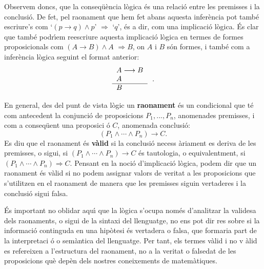 \bigskip

Observem doncs, que la conseq\"{u}\`{e}ncia l\`{o}gica \'{e}s una relaci\'{o}
entre les premisses i la conclusi\'{o}. De fet, pel raonament que hem fet
abans aquesta infer\`{e}ncia pot tamb\'{e} escriure's com `$\left(
p\rightarrow q\right) \wedge p$' $\Longrightarrow$ `$q$', \'{e}s a dir, com
una implicaci\'{o} l\`{o}gica. \'{E}s clar que tamb\'{e} podr\'{\i}em
reescriure aquesta implicaci\'{o} l\`{o}gica en termes de formes
proposicionals com $(A\longrightarrow B)\wedge A$ $\Longrightarrow B$, on $A$
i $B$ s\'{o}n formes, i tamb\'{e} com a infer\`{e}ncia l\`{o}gica seguint el
format anterior:%
\begin{equation*}
\begin{tabular}{l}
$A\longrightarrow B$ \\
$A$ \\ \hline
$B$%
\end{tabular}
\text{.}
\end{equation*}

En general, des del punt de vista l\`{o}gic un \textbf{raonament} \'{e}s un
condicional que t\'{e} com antecedent la conjunci\'{o} de proposicions $%
P_{1},...,P_{n}$, anomenades premisses, i com a conseq\"{u}ent una proposici%
\'{o} $C$, anomenada conclusi\'{o}:%
\begin{equation*}
\left( P_{1}\wedge\cdots\wedge P_{n}\right) \longrightarrow C\text{.}
\end{equation*}
Es diu que el raonament \'{e}s \textbf{v\`{a}lid} si la conclusi\'{o} necess%
\`{a}riament es deriva de les premisses, o sigui, si $\left(
P_{1}\wedge\cdots\wedge P_{n}\right) \longrightarrow C$ \'{e}s tautologia, o
equivalentment, si $\left( P_{1}\wedge\cdots\wedge P_{n}\right)
\Longrightarrow C$. Pensant en la noci\'{o} d'implicaci\'{o} l\`{o}gica,
podem dir que un raonament \'{e}s v\`{a}lid si no podem assignar valors de
veritat a les proposicions que s'utilitzen en el raonament de manera que les
premisses siguin vertaderes i la conclusi\'{o} sigui falsa.

\bigskip

\'{E}s important no oblidar aqu\'{\i} que la l\`{o}gica s'ocupa nom\'{e}s
d'analitzar la validesa dels raonaments, o sigui de la sintaxi del
llenguatge, no ens pot dir res sobre si la informaci\'{o} continguda en una
hip\`{o}tesi \'{e}s vertadera o falsa, que formaria part de la interpretaci%
\'{o} o sem\`{a}ntica del llenguatge. Per tant, els termes v\`{a}lid i no v%
\`{a}lid es refereixen a l'estructura del raonament, no a la veritat o
falsedat de les proposicions qu\`{e} dep\`{e}n dels nostres coneixements de
matem\`{a}tiques.

